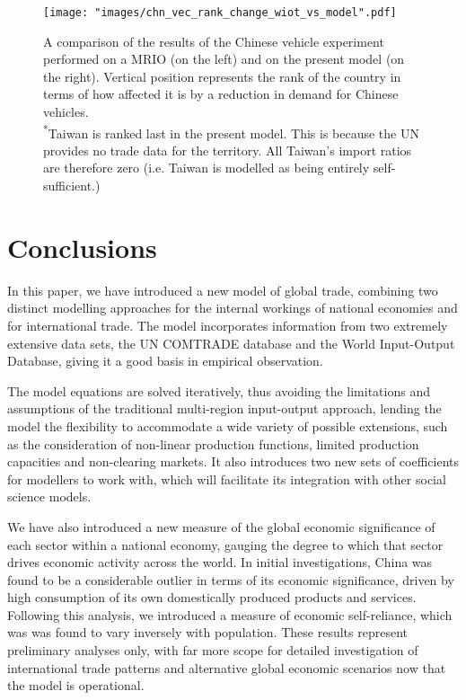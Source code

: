 \documentclass{article}
\begin{document}
\begin{figure}[p]
\centering
\texttt{[image: "images/chn\_vec\_rank\_change\_wiot\_vs\_model".pdf]}
\caption{A comparison of the results of the Chinese vehicle experiment performed on a MRIO (on the left) and on the present model (on the right).
Vertical position represents the rank of the country in terms of how affected it is by a reduction in demand for Chinese vehicles.\\
\textsuperscript{*}Taiwan is ranked last in the present model.
This is because the UN provides no trade data for the territory.
All Taiwan's import ratios are therefore zero (i.e. Taiwan is modelled as being entirely self-sufficient.)}
\label{fig:chn_vec_model_vs_wiot}
\end{figure}


\section{Conclusions}\label{sec:conclusions}
In this paper, we have introduced a new model of global trade, combining two distinct modelling approaches for the internal workings of national economies and for international trade.
The model incorporates information from two extremely extensive data sets, the UN COMTRADE database and the World Input-Output Database, giving it a good basis in empirical observation.

The model equations are solved iteratively, thus avoiding the limitations and assumptions of the traditional multi-region input-output approach, lending the model the flexibility to accommodate a wide variety of possible extensions, such as the consideration of non-linear production functions, limited production capacities and non-clearing markets.
It also introduces two new sets of coefficients for modellers to work with, which will facilitate its integration with other social science models.

We have also introduced a new measure of the global economic significance of each sector within a national economy, gauging the degree to which that sector drives economic activity across the world.
In initial investigations, China was found to be a considerable outlier in terms of its economic significance, driven by high consumption of its own domestically produced products and services.
Following this analysis, we introduced a measure of economic self-reliance, which was was found to vary inversely with population.
These results represent preliminary analyses only, with far more scope for detailed investigation of international trade patterns and alternative global economic scenarios now that the model is operational.
\end{document}
